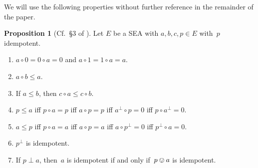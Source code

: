 \documentclass[a4paper, onecolumn, accepted=2020-12-22]{quantumarticle}
\newcommand{\mult}{\mathop{\circ}}
\newcounter{counter}
\theoremstyle{definition}
\newtheorem{proposition}[counter]{Proposition}
\begin{document}
We will use the following properties without further reference in the remainder of the paper.
\begin{proposition}[Cf.~\S3 of \cite{gudder2002sequential}]\label{prop:SEAbasicproperties}
    Let $E$ be a SEA with $a,b,c,p \in E$
        with~$p$ idempotent.
    \begin{enumerate}
        \item
            \label{prop:SEAbasicproperties-1}
            $a\mult 0 = 0 \mult a = 0$ and $a\mult 1 = 1\mult a = a$.
        \item 
            \label{prop:SEAbasicproperties-2}
            $a\mult b \leq a$.
        \item 
            \label{prop:SEAbasicproperties-3}
            If $a\leq b$, then $c\mult a\leq c\mult b$.
        \item
            \label{prop:SEAbasicproperties-4}
            $p\leq a$ iff $p\mult a =p$ iff $a\mult p = p$
            iff $a^\perp\circ p = 0$
            iff $p \circ a^\perp = 0$.
        \item
            \label{prop:SEAbasicproperties-5}
            $a\leq p$ iff $p\mult a=a$ iff $ a\mult p = a$
            iff $a\circ p^\perp = 0$ iff $p^\perp\circ a=0$.
        \item
            \label{prop:SEAbasicproperties-6}
            $p^\perp$ is idempotent.
        \item
            \label{prop:SEAbasicproperties-7}
            If $p \perp a$, then~$a$ is idempotent if and only if~$p \ovee a$
                is idempotent.
    \end{enumerate}
\end{proposition}
\end{document}
